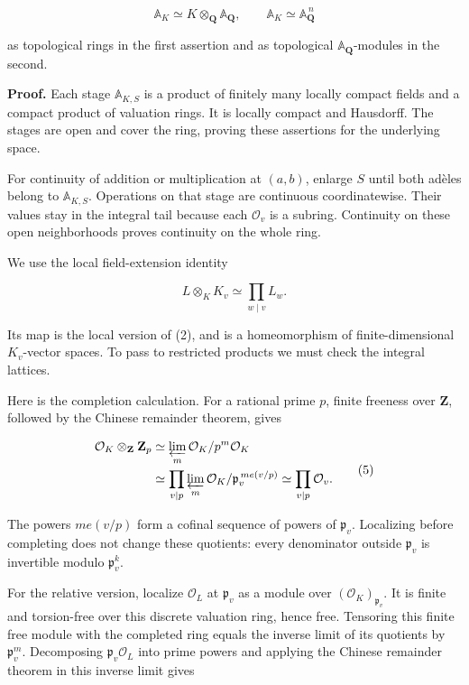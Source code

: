 \documentclass[
  english,
  11pt,
  a4paper,
]{article}
\begin{document}
\[\mathbb A_K\simeq K\otimes_{\mathbf Q}\mathbb A_{\mathbf Q},
\qquad
\mathbb A_K\simeq\mathbb A_{\mathbf Q}^{\,n}
\tag{3}\]

as topological rings in the first assertion and as topological
\(\mathbb A_{\mathbf Q}\)-modules in the second.

\textbf{Proof.} Each stage \(\mathbb A_{K,S}\) is a product of finitely
many locally compact fields and a compact product of valuation rings. It
is locally compact and Hausdorff. The stages are open and cover the
ring, proving these assertions for the underlying space.

For continuity of addition or multiplication at \((a,b)\), enlarge \(S\)
until both adèles belong to \(\mathbb A_{K,S}\). Operations on that
stage are continuous coordinatewise. Their values stay in the integral
tail because each \(\mathcal O_v\) is a subring. Continuity on these
open neighborhoods proves continuity on the whole ring.

We use the local field-extension identity

\[L\otimes_K K_v\simeq\prod_{w\mid v}L_w.
\tag{4}\]

Its map is the local version of (2), and is a homeomorphism of
finite-dimensional \(K_v\)-vector spaces. To pass to restricted products
we must check the integral lattices.

Here is the completion calculation. For a rational prime \(p\), finite
freeness over \(\mathbf Z\), followed by the Chinese remainder theorem,
gives

\[\begin{aligned}
\mathcal O_K\otimes_{\mathbf Z}\mathbf Z_p
&\simeq\varprojlim_m\mathcal O_K/p^m\mathcal O_K\\
&\simeq\prod_{v\mid p}\varprojlim_m
\mathcal O_K/\mathfrak p_v^{\,m e(v/p)}
\simeq\prod_{v\mid p}\mathcal O_v.
\end{aligned}
\tag{5}\]

The powers \(m e(v/p)\) form a cofinal sequence of powers of
\(\mathfrak p_v\). Localizing before completing does not change these
quotients: every denominator outside \(\mathfrak p_v\) is invertible
modulo \(\mathfrak p_v^k\).

For the relative version, localize \(\mathcal O_L\) at \(\mathfrak p_v\)
as a module over \((\mathcal O_K)_{\mathfrak p_v}\). It is finite and
torsion-free over this discrete valuation ring, hence free. Tensoring
this finite free module with the completed ring equals the inverse limit
of its quotients by \(\mathfrak p_v^m\). Decomposing
\(\mathfrak p_v\mathcal O_L\) into prime powers and applying the Chinese
remainder theorem in this inverse limit gives
\end{document}
